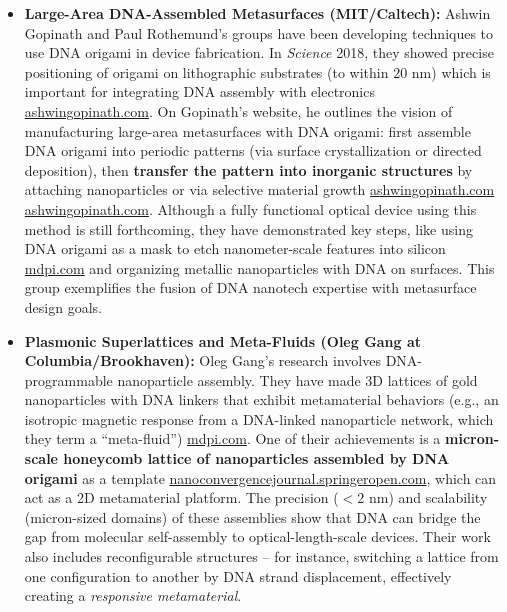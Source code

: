 \documentclass[11pt,a4paper]{article}
\begin{document}
\begin{itemize}
  \item \textbf{Large-Area DNA-Assembled Metasurfaces (MIT/Caltech):} Ashwin Gopinath and Paul Rothemund's groups have been developing techniques to use DNA origami in device fabrication. In \emph{Science} 2018, they showed precise positioning of origami on lithographic substrates (to within 20 nm) which is important for integrating DNA assembly with electronics \href{https://ashwingopinath.com/large-area-nanopatterning#:~:text=Figure ,large area patterning could be}{ashwingopinath.com}. On Gopinath's website, he outlines the vision of manufacturing large-area metasurfaces with DNA origami: first assemble DNA origami into periodic patterns (via surface crystallization or directed deposition), then \textbf{transfer the pattern into inorganic structures} by attaching nanoparticles or via selective material growth \href{https://ashwingopinath.com/large-area-nanopatterning#:~:text=Figure ,large area patterning could be}{ashwingopinath.com} \href{https://ashwingopinath.com/large-area-nanopatterning#:~:text=An intriguing alternative to using,e illustrates a potential}{ashwingopinath.com}. Although a fully functional optical device using this method is still forthcoming, they have demonstrated key steps, like using DNA origami as a mask to etch nanometer-scale features into silicon \href{https://www.mdpi.com/2079-6374/12/11/962#:~:text=DNA origami can be organized,lithography to create discrete%2C well}{mdpi.com} and organizing metallic nanoparticles with DNA on surfaces. This group exemplifies the fusion of DNA nanotech expertise with metasurface design goals.
  \item \textbf{Plasmonic Superlattices and Meta-Fluids (Oleg Gang at Columbia/Brookhaven):} Oleg Gang's research involves DNA-programmable nanoparticle assembly. They have made 3D lattices of gold nanoparticles with DNA linkers that exhibit metamaterial behaviors (e.g., an isotropic magnetic response from a DNA-linked nanoparticle network, which they term a ``meta-fluid'') \href{https://www.mdpi.com/2079-6374/12/11/962#:~:text=metafluid on gram,high ionic strength buffer with}{mdpi.com}. One of their achievements is a \textbf{micron-scale honeycomb lattice of nanoparticles assembled by DNA origami} as a template \href{https://nanoconvergencejournal.springeropen.com/articles/10.1186/s40580-020-00226-7#:~:text=match at L939 Programmable DNA,plasmonic nanoparticle metamaterials with high}{nanoconvergencejournal.springeropen.com}, which can act as a 2D metamaterial platform. The precision ($<2$ nm) and scalability (micron-sized domains) of these assemblies show that DNA can bridge the gap from molecular self-assembly to optical-length-scale devices. Their work also includes reconfigurable structures -- for instance, switching a lattice from one configuration to another by DNA strand displacement, effectively creating a \emph{responsive metamaterial}.

\end{itemize}
\end{document}
